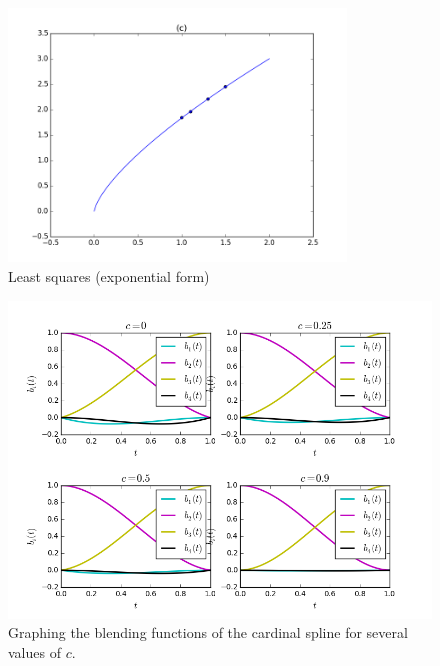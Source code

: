 \documentclass[10pt]{article}
\theoremstyle{plain}
\theoremstyle{definition}
\numberwithin{equation}{section}
\begin{document}
\begin{figure}[p]
    \begin{center}
        \includegraphics[width=0.8\textwidth]{p1_exp}
        \caption{Least squares (exponential form)}
    \end{center}
\end{figure}

\begin{figure}[p]
    \begin{center}
    \includegraphics[width=.8\textwidth]{cardinals}
    \caption{Graphing the blending functions of the cardinal spline for several values of $c$.}
    \end{center}
\end{figure}
\end{document}
